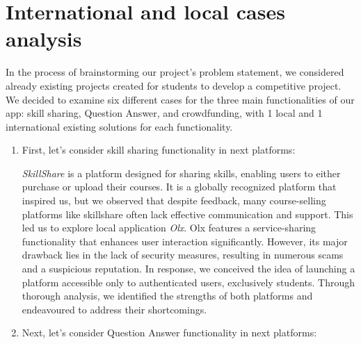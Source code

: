 \newpage
\section{International and local cases analysis} \label{intandloc}

\hspace*{0.5cm} In the process of brainstorming our project's problem statement, we considered already existing projects created for students to develop a competitive project. We decided to examine six different cases for the three main functionalities of our app: skill sharing, Question Answer, and crowdfunding, with 1 local and 1 international existing solutions for each functionality.

\begin{enumerate}
    \item First, let’s consider skill sharing functionality in next platforms:

     \textit{SkillShare} is a platform designed for sharing skills, enabling users to either purchase or upload their courses. It is a globally recognized platform that inspired us, but we observed that despite feedback, many course-selling platforms like skillshare often lack effective communication and support. This led us to explore local application \textit{Olx}. Olx \cite{olx} features a service-sharing functionality that enhances user interaction significantly. However, its major drawback lies in the lack of security measures, resulting in numerous scams and a suspicious reputation. In response, we conceived the idea of launching a platform accessible only to authenticated users, exclusively students. Through thorough analysis, we identified the strengths of both platforms and endeavoured to address their shortcomings.

     \item Next, let’s consider Question Answer functionality in next platforms:


\end{enumerate}
